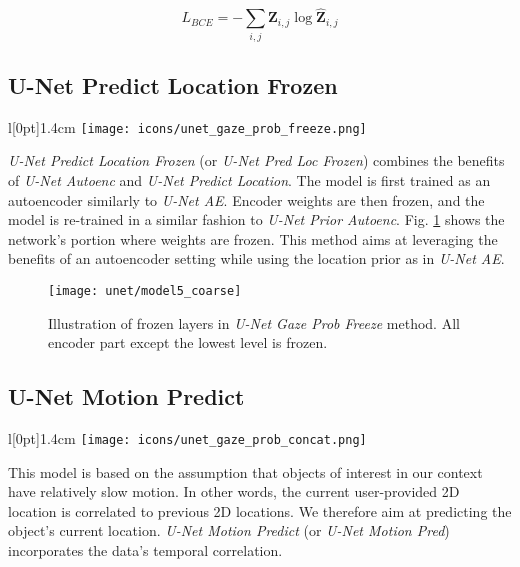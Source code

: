 \begin{equation}
L_{BCE} = -\sum_{i,j} \boldsymbol{Z}_{i,j} \log{\boldsymbol{\hat{Z}}_{i,j}}
\label{eq:ce_loss}
\end{equation}
\hspace{6pt}

\clearpage
\subsection{U-Net Predict Location Frozen}

\setlength\intextsep{0pt}
\begin{wrapfigure}[4]{l}[0pt]{1.4cm}
\texttt{[image: icons/unet\_gaze\_prob\_freeze.png]}
\end{wrapfigure}

\textit{U-Net Predict Location Frozen} (or \textit{U-Net Pred Loc Frozen}) combines the benefits of \textit{U-Net Autoenc} and \textit{U-Net Predict Location}.
The model is first trained as an autoencoder similarly to \textit{U-Net AE}.
Encoder weights are then frozen, and the model is re-trained in a similar fashion to \textit{U-Net Prior Autoenc}.
Fig. \ref{fig:model_freeze} shows the network's portion where weights are frozen.
This method aims at leveraging the benefits of an autoencoder setting while using the location prior as in \textit{U-Net AE}.

\begin{figure}[htbp]
  \centering
  \texttt{[image: unet/model5\_coarse]}
  \caption[Modified U-Net with freezed encoder part]{Illustration of frozen layers in \textit{U-Net Gaze Prob Freeze} method. All encoder part except the lowest level is frozen.}
  \label{fig:model_freeze}
\end{figure}

\subsection{U-Net Motion Predict} \label{sec:unet_pred_loc_concat}
\begingroup
\setlength\intextsep{0pt}
\begin{wrapfigure}[4]{l}[0pt]{1.4cm}
\texttt{[image: icons/unet\_gaze\_prob\_concat.png]}
\end{wrapfigure}

This model is based on the assumption that objects of interest in our context have relatively slow motion.
In other words, the current user-provided 2D location is correlated to previous 2D locations.
We therefore aim at predicting the object's current location.
\textit{U-Net Motion Predict} (or \textit{U-Net Motion Pred}) incorporates the data's temporal correlation.

